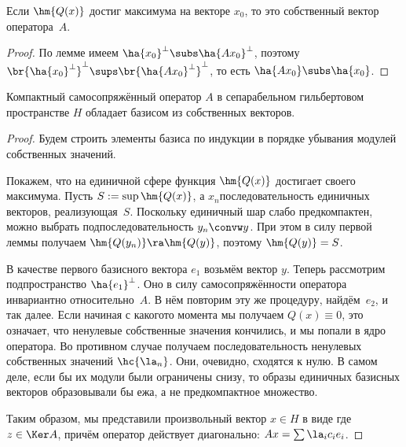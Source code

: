 \documentclass[a4paper]{article}
\begin{document}
\begin{imp}
Если $\hm{Q(x)}$ достиг максимума на векторе $x_0$, то это собственный вектор оператора~$A$.
\end{imp}
\begin{proof}
По лемме имеем $\ha{x_0}^\bot \subs \ha{Ax_0}^\bot$, поэтому $\br{\ha{x_0}^\bot}^\bot \sups
\br{\ha{Ax_0}^\bot}^\bot$, то есть $\ha{Ax_0} \subs \ha{x_0}$.
\end{proof}

\begin{theorem}
Компактный самосопряжённый оператор $A$ в сепарабельном гильбертовом пространстве $H$
обладает базисом из собственных векторов.
\end{theorem}
\begin{proof}
Будем строить элементы базиса по индукции в порядке убывания модулей собственных значений.

Покажем, что на единичной сфере функция $\hm{Q(x)}$ достигает своего максимума. Пусть $S := \sup \hm{Q(x)}$,
а $x_n$\т последовательность единичных векторов, реализующая~$S$. Поскольку единичный шар
слабо предкомпактен, можно выбрать подпоследовательность $y_n \convw y$. При этом
в силу первой леммы получаем $\hm{Q(y_n)} \ra \hm{Q(y)}$, поэтому $\hm{Q(y)} = S$.

В качестве первого базисного вектора $e_1$ возьмём вектор $y$. Теперь рассмотрим подпространство
$\ha{e_1}^\bot$. Оно в силу самосопряжённости оператора инвариантно относительно~$A$. В нём
повторим эту же процедуру, найдём~$e_2$, и так далее.
Если начиная с какого\д то момента мы получаем $Q(x) \equiv 0$, это означает, что ненулевые собственные
значения кончились, и мы попали в ядро оператора. Во противном случае получаем последовательность
ненулевых собственных значений $\hc{\la_n}$. Они, очевидно, сходятся к нулю. В самом деле, если
бы их модули были ограничены снизу, то образы единичных базисных векторов образовывали бы ежа,
а не предкомпактное множество.

Таким образом, мы представили произвольный вектор $x \in H$ в виде
где $z \in \Ker A$, причём оператор действует диагонально: $Ax = \sum \la_i c_i e_i$.
\end{proof}
\end{document}

